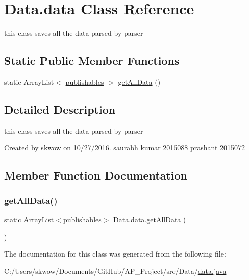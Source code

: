 \hypertarget{class_data_1_1data}{}\section{Data.\+data Class Reference}
\label{class_data_1_1data}


this class saves all the data parsed by parser  


\subsection*{Static Public Member Functions}
\begin{DoxyCompactItemize}
\item 
static Array\+List$<$ \hyperlink{class_data_1_1publishables}{publishables} $>$ \hyperlink{class_data_1_1data_adea6f2f27eedd673e6514f30ff4731e8}{get\+All\+Data} ()
\end{DoxyCompactItemize}


\subsection{Detailed Description}
this class saves all the data parsed by parser 

Created by skwow on 10/27/2016. saurabh kumar 2015088 prashant 2015072 

\subsection{Member Function Documentation}
\hypertarget{class_data_1_1data_adea6f2f27eedd673e6514f30ff4731e8}{}\label{class_data_1_1data_adea6f2f27eedd673e6514f30ff4731e8} 
\subsubsection{\texorpdfstring{get\+All\+Data()}{getAllData()}}
{\footnotesize\ttfamily static Array\+List$<$\hyperlink{class_data_1_1publishables}{publishables}$>$ Data.\+data.\+get\+All\+Data (\begin{DoxyParamCaption}{ }\end{DoxyParamCaption})\hspace{0.3cm}{\ttfamily [static]}}



The documentation for this class was generated from the following file\+:\begin{DoxyCompactItemize}
\item 
C\+:/\+Users/skwow/\+Documents/\+Git\+Hub/\+A\+P\+\_\+\+Project/src/\+Data/\hyperlink{data_8java}{data.\+java}\end{DoxyCompactItemize}
